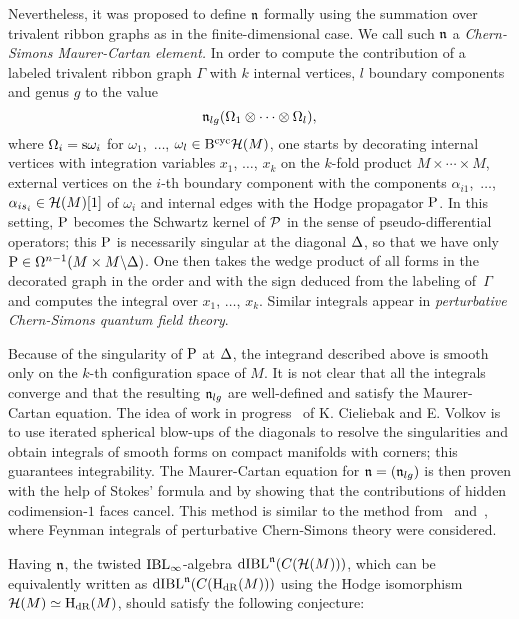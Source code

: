\documentclass[\MainFolder/Text.tex]{subfiles}
\begin{document}
Nevertheless, it was proposed to define $\mathfrak{n}$ formally using the summation over trivalent ribbon graphs as in the finite-dimensional case. We call such $\mathfrak{n}$ a \emph{Chern-Simons Maurer-Cartan element.} In order to compute the contribution of a labeled trivalent ribbon graph $\Gamma$ with $k$ internal vertices, $l$ boundary components and genus $g$ to the value
$$ \mathfrak{n}_{lg}(\Omega_1\otimes \dotsb \otimes \Omega_l), $$
where $\Omega_i = \mathrm{s} \omega_i$ for $\omega_1$,~$\dotsc$, $\omega_l \in \mathrm{B}^{\mathrm{cyc}}\mathcal{H}(M)$, one starts by decorating internal vertices with integration variables $x_1$, $\dotsc$, $x_k$ on the $k$-fold product $M\times \dotsb \times M$, external vertices on the $i$-th boundary component with the components $\alpha_{i1}$,~$\dotsc$, $\alpha_{i s_i} \in\mathcal{H}(M)[1]$ of $\omega_i$ and internal edges with the Hodge propagator $\mathrm{P}$. In this setting, $\mathrm{P}$ becomes the Schwartz kernel of $\mathcal{P}$ in the sense of pseudo-differential operators; this $\mathrm{P}$ is necessarily singular at the diagonal $\Delta$, so that we have only $\mathrm{P} \in \Omega^{n-1}(M\times M \backslash \Delta)$. One then takes the wedge product of all forms in the decorated graph in the order and with the sign deduced from the labeling of~$\Gamma$ and computes the integral over $x_1$, $\dotsc$, $x_k$. Similar integrals appear in \emph{perturbative Chern-Simons quantum field theory}.


Because of the singularity of $\mathrm{P}$ at $\Delta$, the integrand described above is smooth only on the $k$-th configuration space of $M$. It is not clear that all the integrals converge and that the resulting $\mathfrak{n}_{lg}$ are well-defined and satisfy the Maurer-Cartan equation. The idea of work in progress~\cite{Cieliebak2018} of K. Cieliebak and E. Volkov is to use iterated spherical blow-ups of the diagonals to resolve the singularities and obtain integrals of smooth forms on compact manifolds with corners; this guarantees integrability. The Maurer-Cartan equation for $\mathfrak{n} = (\mathfrak{n}_{lg})$ is then proven with the help of Stokes' formula and by showing that the contributions of hidden codimension-$1$ faces cancel. This method is similar to the method from~\cite{Axelrod1991} and~\cite{Axelrod1993}, where Feynman integrals of perturbative Chern-Simons theory were considered.

Having $\mathfrak{n}$, the twisted $\mathrm{IBL}_\infty$-algebra $\mathrm{dIBL}^{\mathfrak{n}}(C(\mathcal{H}(M)))$, which can be equivalently written as $\mathrm{dIBL}^{\mathfrak{n}}(C(\mathrm{H}_{\mathrm{dR}}(M)))$ using the Hodge isomorphism $\mathcal{H}(M)\simeq \mathrm{H}_{\mathrm{dR}}(M)$, should satisfy the following conjecture:
\end{document}
